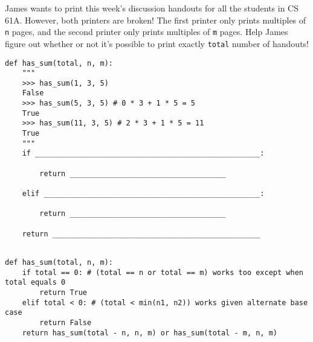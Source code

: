 \begin{blocksection}
\question James wants to print this week's discussion handouts for all the students in CS 61A.
However, both printers are broken! The first printer only prints multiples of \lstinline$n$
pages, and the second printer only prints multiples of \lstinline$m$ pages. Help James figure
out whether or not it's possible to print exactly \lstinline$total$ number of handouts! \\

\begin{lstlisting}
def has_sum(total, n, m):
    """
    >>> has_sum(1, 3, 5)
    False
    >>> has_sum(5, 3, 5) # 0 * 3 + 1 * 5 = 5
    True
    >>> has_sum(11, 3, 5) # 2 * 3 + 1 * 5 = 11
    True
    """
    if ____________________________________________________:
		
        return ____________________________________
				
    elif __________________________________________________:
		
        return ____________________________________
				
    return ________________________________________________
    
\end{lstlisting}

\begin{solution}[1.5in]
\begin{lstlisting}
def has_sum(total, n, m):
    if total == 0: # (total == n or total == m) works too except when total equals 0
        return True
    elif total < 0: # (total < min(n1, n2)) works given alternate base case
        return False
    return has_sum(total - n, n, m) or has_sum(total - m, n, m)
\end{lstlisting}
\end{solution}
\end{blocksection}
